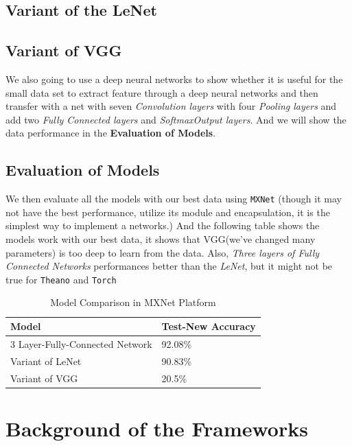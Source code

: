 \documentclass[12pt]{article}
\begin{document}
\subsection{Variant of the LeNet}

\subsection{Variant of VGG}
We also going to use a deep neural networks to show whether it is useful for the small data set to extract feature through a deep neural networks and then transfer with a net with seven {\it Convolution layers} with four {\it Pooling layers} and add two {\it Fully Connected layers} and {\it SoftmaxOutput layers}. And we will show the data performance in the {\bf Evaluation of Models}.

\subsection{Evaluation of Models}
We then evaluate all the models with our best data using \texttt{MXNet} (though it may not have the best performance, utilize its module and encapsulation, it is the simplest way to implement a networks.)
And the following table shows the models work with our best data, it shows that VGG(we've changed many parameters) is too deep to learn from the data. Also, {\it Three layers of Fully Connected Networks} performances better than the {\it LeNet}, but it might not be true for \texttt{Theano} and \texttt{Torch}

\begin{table}[!htbp]
	\caption {Model Comparison in MXNet Platform} \label{tab:title} 
	\begin{center}
		\begin{tabular}{|l|l|}
			\hline
			Model & Test-New Accuracy \\
			\hline
			3 Layer-Fully-Connected Network & 92.08\% \\
			\hline
			Variant of LeNet & 90.83\% \\
			\hline
			Variant of VGG & 20.5\% \\
			\hline
		\end{tabular}
	\end{center}
\end{table} 


\section{Background of the Frameworks}
\end{document}
